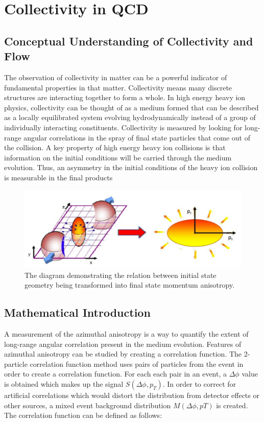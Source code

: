 \chapter{Collectivity in QCD}
\section{Conceptual Understanding of Collectivity and Flow}
The observation of collectivity in matter can be a powerful indicator of fundamental properties in that matter. Collectivity means many discrete structures are interacting together to form a whole. In high energy heavy ion physics, collectivity can be thought of as a medium formed that can be described as a locally equilibrated system evolving hydrodynamically instead of a group of individually interacting constituents. Collectivity is measured by looking for long-range angular correlations in the spray of final state particles that come out of the collision. A key property of high energy heavy ion collisions is that information on the initial conditions will be carried through the medium evolution. Thus, an asymmetry in the initial conditions of the heavy ion collision is measurable in the final products
\begin{figure}[!ht]
\begin{center}
\includegraphics[width=0.45\linewidth]{figs/elliptical_flow_cartoon.png}
\caption{ The diagram demonstrating the relation between initial state geometry being transformed into final state momentum anisotropy. }
\end{center}
\end{figure}

\section{Mathematical Introduction}
A measurement of the azimuthal anisotropy is a way to quantify the extent of long-range angular correlation present in the medium evolution. Features of azimuthal anisotropy can be studied by creating a correlation function. The 2-particle correlation function method uses pairs of particles from the event in order to create a correlation function. For each each pair in an event, a $\Delta\phi$ value is obtained which makes up the signal $S(\Delta\phi,p_T)$. In order to correct for artificial correlations which would distort the distribution from detector effects or other sources, a mixed event background distribution $M(\Delta\phi,pT)$ is created. The correlation function can be defined as follows:

